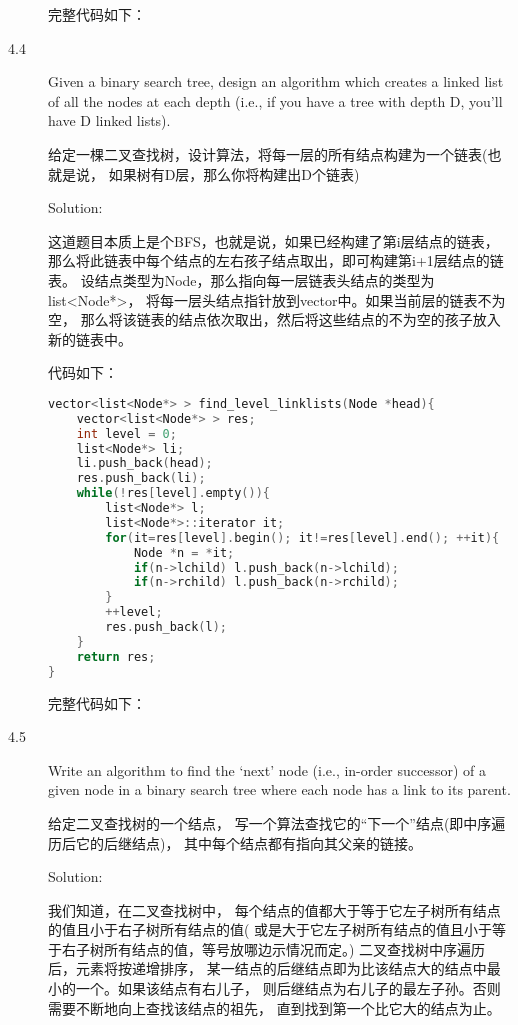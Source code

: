 \begin{description}
完整代码如下：




\item[4.4] Given a binary search tree, design an algorithm which creates a linked list of all the nodes at each depth (i.e., if you have a tree with depth D, you’ll have D linked lists).

给定一棵二叉查找树，设计算法，将每一层的所有结点构建为一个链表(也就是说， 如果树有D层，那么你将构建出D个链表)

Solution: 

这道题目本质上是个BFS，也就是说，如果已经构建了第i层结点的链表， 那么将此链表中每个结点的左右孩子结点取出，即可构建第i+1层结点的链表。 设结点类型为Node，那么指向每一层链表头结点的类型为list<Node*>， 将每一层头结点指针放到vector中。如果当前层的链表不为空， 那么将该链表的结点依次取出，然后将这些结点的不为空的孩子放入新的链表中。

代码如下：
\begin{lstlisting}[language=C++]
vector<list<Node*> > find_level_linklists(Node *head){
    vector<list<Node*> > res;
    int level = 0;
    list<Node*> li;
    li.push_back(head);
    res.push_back(li);
    while(!res[level].empty()){
        list<Node*> l;
        list<Node*>::iterator it;
        for(it=res[level].begin(); it!=res[level].end(); ++it){
            Node *n = *it;
            if(n->lchild) l.push_back(n->lchild);
            if(n->rchild) l.push_back(n->rchild);
        }
        ++level;
        res.push_back(l);
    }
    return res;
}
\end{lstlisting}

完整代码如下：




\item[4.5] Write an algorithm to find the ‘next’ node (i.e., in-order successor) of a given node in a binary search tree where each node has a link to its parent.

给定二叉查找树的一个结点， 写一个算法查找它的“下一个”结点(即中序遍历后它的后继结点)， 其中每个结点都有指向其父亲的链接。

Solution: 

我们知道，在二叉查找树中， 每个结点的值都大于等于它左子树所有结点的值且小于右子树所有结点的值( 或是大于它左子树所有结点的值且小于等于右子树所有结点的值，等号放哪边示情况而定。) 二叉查找树中序遍历后，元素将按递增排序， 某一结点的后继结点即为比该结点大的结点中最小的一个。如果该结点有右儿子， 则后继结点为右儿子的最左子孙。否则需要不断地向上查找该结点的祖先， 直到找到第一个比它大的结点为止。


\end{description}
